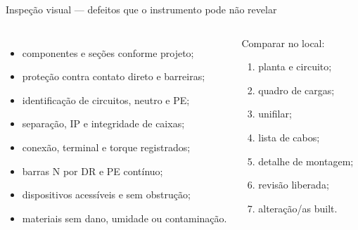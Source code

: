 \begin{frame}{Inspeção visual — defeitos que o instrumento pode não revelar}
\small
\begin{columns}[T,onlytextwidth]
\begin{itemize}
\item componentes e seções conforme projeto;
\item proteção contra contato direto e barreiras;
\item identificação de circuitos, neutro e PE;
\item separação, IP e integridade de caixas;
\item conexão, terminal e torque registrados;
\item barras N por DR e PE contínuo;
\item dispositivos acessíveis e sem obstrução;
\item materiais sem dano, umidade ou contaminação.
\end{itemize}
\begin{caixaProjeto}[title=Leitura cruzada]
Comparar no local:
\begin{enumerate}
\item planta e circuito;
\item quadro de cargas;
\item unifilar;
\item lista de cabos;
\item detalhe de montagem;
\item revisão liberada;
\item alteração/as built.
\end{enumerate}
\end{caixaProjeto}
\end{columns}
\end{frame}

